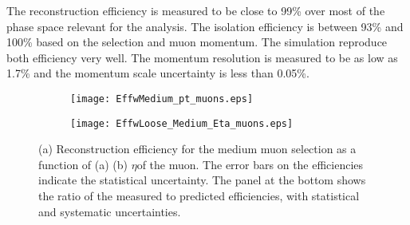 The reconstruction efficiency is measured to be close to 99\% over most of the phase space relevant for the analysis. 
The isolation efficiency is between 93\% and 100\% based on the selection and muon momentum. The simulation reproduce both efficiency very well.
The  momentum resolution is measured to be as low as 1.7\% and the momentum scale uncertainty is less than  0.05\%.

\begin{figure}[htb!]
\centering
\begin{subfigure}[t]{0.54\textwidth}
\texttt{[image: EffwMedium\_pt\_muons.eps]}
\subcaption{}
\label{fig:}
\end{subfigure}
\begin{subfigure}[t]{0.4\textwidth}
\texttt{[image: EffwLoose\_Medium\_Eta\_muons.eps]}
\subcaption{}
\label{fig:}
\end{subfigure}
\vspace{-0.25cm}
\caption{(a) Reconstruction efficiency for the medium muon selection as a function of (a) \pt (b) $\eta $of the muon.
 The error bars on the efficiencies indicate the statistical uncertainty. The panel at the bottom shows the ratio of the measured to predicted efficiencies, with statistical and systematic uncertainties.
}
\label{fig:exp.reco.muon}
\end{figure} 


